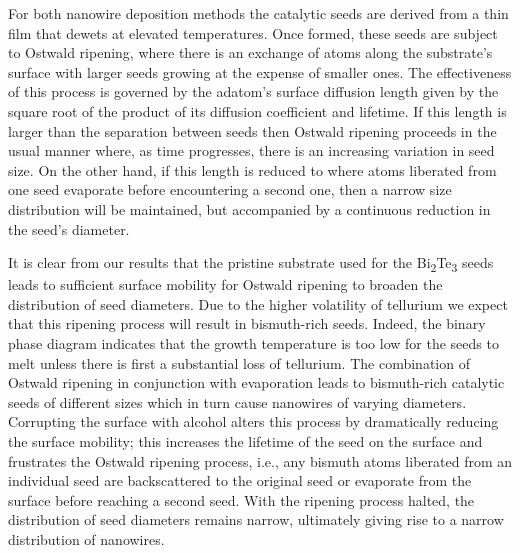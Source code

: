 For both nanowire deposition methods the catalytic seeds are derived from a thin film that dewets at elevated temperatures.
Once formed, these seeds are subject to Ostwald ripening, where there is an exchange of atoms along the substrate's surface with larger seeds growing at the expense of smaller ones\cite{Raab2000a,Li2003b}.
The effectiveness of this process is governed by the adatom's surface diffusion length given by the square root of the product of its diffusion coefficient and lifetime.
If this length is larger than the separation between seeds then Ostwald ripening proceeds in the usual manner where, as time progresses, there is an increasing variation in seed size.
On the other hand, if this length is reduced to where atoms liberated from one seed evaporate before encountering a second one, then a narrow size distribution will be maintained, but accompanied by a continuous reduction in the seed's diameter.

It is clear from our results that the pristine substrate used for the Bi\textsubscript{2}Te\textsubscript{3} seeds leads to sufficient surface mobility for Ostwald ripening to broaden the distribution of seed diameters.
Due to the higher volatility of tellurium we expect that this ripening process will result in bismuth-rich seeds.
Indeed, the binary phase diagram indicates that the growth temperature is too low for the seeds to melt unless there is first a substantial loss of tellurium\cite{MassalskiTBMurrayJL1986}.
The combination of Ostwald ripening in conjunction with evaporation leads to bismuth-rich catalytic seeds of different sizes which in turn cause nanowires of varying diameters.
Corrupting the surface with alcohol alters this process by dramatically reducing the surface mobility; this increases the lifetime of the seed on the surface and frustrates the Ostwald ripening process, i.e., any bismuth atoms liberated from an individual seed are backscattered to the original seed or evaporate from the surface before reaching a second seed.
With the ripening process halted, the distribution of seed diameters remains narrow, ultimately giving rise to a narrow distribution of nanowires.

